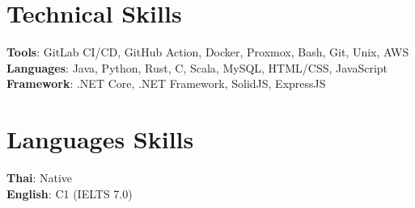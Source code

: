 \documentclass[letterpaper,11pt]{article}
\makeatletter
\newcommand{\resumeItem}[1]{
  \item\small{
    {#1 \vspace{-2pt}}
  }
}
\newcommand{\resumeProjectHeading}[2]{
    \item
    \begin{tabular*}{0.97\textwidth}{l@{\extracolsep{\fill}}r}
      \small#1 & #2 \\
    \end{tabular*}\vspace{-7pt}
}
\newcommand{\resumeSubHeadingListStart}{\begin{itemize}[leftmargin=0.15in, label={}]}
\newcommand{\resumeSubHeadingListEnd}{\end{itemize}}
\newcommand{\resumeItemListStart}{\begin{itemize}}
\newcommand{\resumeItemListEnd}{\end{itemize}\vspace{-5pt}}
\makeatother
\begin{document}
\section{Technical Skills}
  \begin{itemize}[leftmargin=0.15in, label={}]
    \small{\item{
      \textbf{Tools}{: GitLab CI/CD, GitHub Action, Docker, Proxmox, Bash, Git, Unix, AWS} \\
      \textbf{Languages}{: Java, Python, Rust, C, Scala, MySQL, HTML/CSS, JavaScript} \\
      \textbf{Framework}{: .NET Core, .NET Framework, SolidJS, ExpressJS}
    }}
  \end{itemize}


\section{Languages Skills}
 \begin{itemize}[leftmargin=0.15in, label={}]
    \small{\item{
     \textbf{Thai}{: Native} \\
     \textbf{English}{: C1 (IELTS 7.0)} \\
    }}
 \end{itemize}


\end{document}

